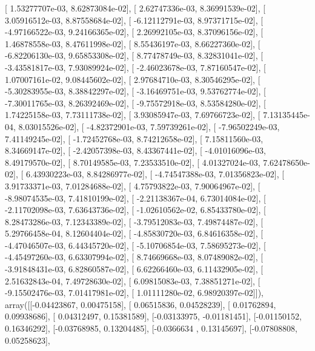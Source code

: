 \documentclass{article}
\begin{document}
       [  1.53277707e-03,   8.62873084e-02],
       [  2.62747336e-03,   8.36991539e-02],
       [  3.05916512e-03,   8.87558684e-02],
       [ -6.12112791e-03,   8.97371715e-02],
       [ -4.97166522e-03,   9.24166365e-02],
       [  2.26992105e-03,   8.37096156e-02],
       [  1.46878558e-03,   8.47611998e-02],
       [  8.55436197e-03,   8.66227360e-02],
       [ -6.82206130e-03,   9.65853308e-02],
       [  8.77478749e-03,   8.32831041e-02],
       [ -3.43581817e-03,   7.93089924e-02],
       [ -2.46023678e-03,   7.87160547e-02],
       [  1.07007161e-02,   9.08445602e-02],
       [  2.97684710e-03,   8.30546295e-02],
       [ -5.30283955e-03,   8.38842297e-02],
       [ -3.16469751e-03,   9.53762774e-02],
       [ -7.30011765e-03,   8.26392469e-02],
       [ -9.75572918e-03,   8.53584280e-02],
       [  1.74225158e-03,   7.73111738e-02],
       [  3.93085947e-03,   7.69766723e-02],
       [  7.13135445e-04,   8.03015526e-02],
       [ -4.82372901e-03,   7.59739261e-02],
       [ -7.96502249e-03,   7.41149245e-02],
       [ -1.72452768e-03,   8.74212658e-02],
       [  7.15811560e-03,   8.34669147e-02],
       [ -2.42057398e-03,   8.43367441e-02],
       [ -4.01016096e-03,   8.49179570e-02],
       [  8.70149585e-03,   7.23533510e-02],
       [  4.01327024e-03,   7.62478650e-02],
       [  6.43930223e-03,   8.84286977e-02],
       [ -4.74547388e-03,   7.01356823e-02],
       [  3.91733371e-03,   7.01284688e-02],
       [  4.75793822e-03,   7.90064967e-02],
       [ -8.98074535e-03,   7.41810199e-02],
       [ -2.21138367e-04,   6.73014084e-02],
       [ -2.11702098e-03,   7.63643736e-02],
       [ -1.02610562e-02,   6.85433780e-02],
       [  8.28473286e-03,   7.12343389e-02],
       [ -3.79512083e-03,   7.49874487e-02],
       [  5.29766458e-04,   8.12604404e-02],
       [ -4.85830720e-03,   6.84616358e-02],
       [ -4.47046507e-03,   6.44345720e-02],
       [ -5.10706854e-03,   7.58695273e-02],
       [ -4.45497260e-03,   6.63307994e-02],
       [  8.74669668e-03,   8.07489082e-02],
       [ -3.91848431e-03,   6.82860587e-02],
       [  6.62266460e-03,   6.11432905e-02],
       [  2.51632843e-04,   7.49728630e-02],
       [  6.09815083e-03,   7.38851271e-02],
       [ -9.15502476e-03,   7.01417981e-02],
       [  1.01111280e-02,   6.98920397e-02]]), array([[-0.04423867,  0.00475158],
       [ 0.06515836,  0.04528239],
       [ 0.01762894,  0.09938686],
       [ 0.04312497,  0.15381589],
       [-0.03133975, -0.01181451],
       [-0.01150152,  0.16346292],
       [-0.03768985,  0.13204485],
       [-0.0366634 ,  0.13145697],
       [-0.07808808,  0.05258623],
\end{document}
